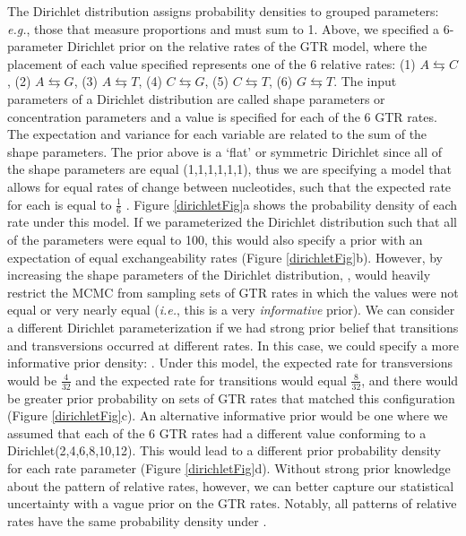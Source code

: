 The Dirichlet distribution assigns probability densities to grouped parameters: {\it e.g.}, those that measure proportions and must sum to 1. 
Above, we specified a 6-parameter Dirichlet prior on the relative rates of the GTR model, where the placement of each value specified represents one of the 6 relative rates: (1) $A\leftrightarrows C$, (2) $A\leftrightarrows G$, (3) $A\leftrightarrows T$, (4) $C\leftrightarrows G$, (5) $C\leftrightarrows T$, (6) $G\leftrightarrows T$. 
The input parameters of a Dirichlet distribution are called shape parameters or concentration parameters and a value is specified for each of the 6 GTR rates. 
The expectation and variance for each variable are related to the sum of the shape parameters.
The prior above is a `flat' or symmetric Dirichlet since all of the shape parameters are equal (1,1,1,1,1,1), thus we are specifying a model that allows for equal rates of change between nucleotides, such that the expected rate for each is equal to $\frac{1}{6}$ \citep{zwickl04}.
Figure \ref{dirichletFig}a shows the probability density of each rate under this model.
If we parameterized the Dirichlet distribution such that all of the parameters were equal to 100, this would also specify a prior with an expectation of equal exchangeability rates (Figure \ref{dirichletFig}b). 
However, by increasing the shape parameters of the Dirichlet distribution, , would heavily restrict the MCMC from sampling sets of GTR rates in which the values were not equal or very nearly equal ({\it i.e.}, this is a very {\em informative} prior). 
We can consider a different Dirichlet parameterization if we had strong prior belief that transitions and transversions occurred at different rates.
In this case, we could specify a more informative prior density: . 
Under this model, the expected rate for transversions would be $\frac{4}{32}$ and the expected rate for transitions would equal $\frac{8}{32}$, and there would be greater prior probability on sets of GTR rates that matched this configuration (Figure \ref{dirichletFig}c). 
An alternative informative prior would be one where we assumed that each of the 6 GTR rates had a different value conforming to a Dirichlet(2,4,6,8,10,12). 
This would lead to a different prior probability density for each rate parameter (Figure \ref{dirichletFig}d).
Without strong prior knowledge about the pattern of relative rates, however, we can better capture our statistical uncertainty with a vague prior on the GTR rates. 
Notably, all patterns of relative rates have the same probability density under .

